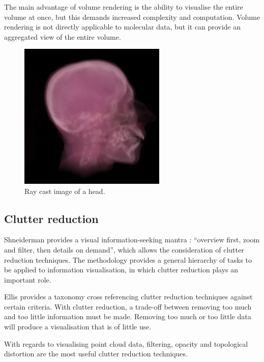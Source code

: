 The main advantage of volume rendering is the ability to visualise the entire
volume at once, but this demands increased complexity and computation. Volume
rendering is not directly applicable to molecular data, but it can provide an
aggregated view of the entire volume.

\begin{figure}[h!]
  \begin{center}
    \includegraphics[width=70mm]{head_volume}
  \end{center}
  \caption{Ray cast image of a head.}
  \label{fig:background_head}
\end{figure}


\subsection{Clutter reduction}
\label{sub:background_clutter}

Shneiderman provides a visual information-seeking mantra \citep{shneiderman96}:
``overview first, zoom and filter, then details on demand'', which allows the
consideration of clutter reduction techniques. The methodology provides a
general hierarchy of tasks to be applied to information visualisation, in which
clutter reduction plays an important role.

Ellis \citet{ellis07} provides a taxonomy cross referencing clutter reduction
techniques against certain criteria. With clutter reduction, a trade-off
between removing too much and too little information must be made. Removing too
much or too little data will produce a visualisation that is of little use.

With regards to visualising point cloud data, filtering, opacity and topological
distortion are the most useful clutter reduction techniques.

